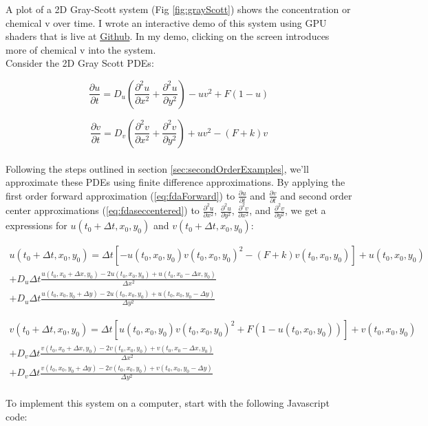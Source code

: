 {  A plot of a 2D Gray-Scott system (Fig \ref{fig:grayScott}) shows the concentration or chemical v over time.  I wrote an interactive demo of this system using GPU shaders that is live at  \href{http://git.amandaghassaei.com/ReactionDiffusionShader/}{Github}.  In my demo, clicking on the screen introduces more of chemical v into the system.\\
  
  Consider the 2D Gray Scott PDEs:
  
   \begin{equation}
  \frac{\partial u}{\partial t} = D_{u}\left(\frac{\partial^{2} u}{\partial x^{2}}+\frac{\partial^{2} u}{\partial y^{2}} \right) -uv^{2} + F(1-u)
  \end{equation}
  
   \begin{equation}
  \frac{\partial v}{\partial t} = D_{v}\left(\frac{\partial^{2} v}{\partial x^{2}}+\frac{\partial^{2} v}{\partial y^{2}} \right) +uv^{2} - (F+k)v
  \end{equation}
  \\
  Following the steps outlined in section \ref{sec:secondOrderExamples}, we'll approximate these PDEs using finite difference approximations.  By applying the first order forward approximation (\ref{eq:fdaForward}) to $\frac{\partial u}{\partial t}$ and $\frac{\partial v}{\partial t}$ and second order center approximations (\ref{eq:fdaseccentered}) to $\frac{\partial^{2} u}{\partial x^{2}}$, $\frac{\partial^{2} u}{\partial y^{2}}$, $\frac{\partial^{2} v}{\partial x^{2}}$, and $\frac{\partial^{2} v}{\partial y^{2}}$, we get a expressions for $u(t_{0} + \Delta  t, x_{0}, y_{0})$ and $v(t_{0} + \Delta  t, x_{0}, y_{0})$:
  
   \begin{multline}\label{eq:gsdifferentialu}
    u(t_{0} + \Delta  t, x_{0}, y_{0}) = \Delta  t[-u(t_{0}, x_{0}, y_{0})v(t_{0}, x_{0}, y_{0})^{2} - (F+k)v(t_{0}, x_{0}, y_{0})] + u(t_{0}, x_{0}, y_{0})\\
    + D_{u}\Delta  t\frac{u(t_{0},x_{0} + \Delta  x, y_{0})- 2u(t_{0},x_{0}, y_{0}) + u(t_{0},x_{0} -\Delta  x, y_{0})}{\Delta  x^{2}} \\
    + D_{u}\Delta  t\frac{u(t_{0},x_{0} , y_{0}+ \Delta  y)- 2u(t_{0},x_{0}, y_{0}) + u(t_{0},x_{0} , y_{0}-\Delta  y)}{\Delta  y^{2}}
  \end{multline}
  
    \begin{multline}\label{eq:gsdifferentialv}
    v(t_{0} + \Delta  t, x_{0}, y_{0}) = \Delta  t[u(t_{0}, x_{0}, y_{0})v(t_{0}, x_{0}, y_{0})^{2} + F(1-u(t_{0}, x_{0}, y_{0}))] + v(t_{0}, x_{0}, y_{0})\\
    + D_{v}\Delta  t\frac{v(t_{0},x_{0} + \Delta  x, y_{0})- 2v(t_{0},x_{0}, y_{0}) + v(t_{0},x_{0} -\Delta  x, y_{0})}{\Delta  x^{2}} \\
    + D_{v}\Delta  t\frac{v(t_{0},x_{0} , y_{0}+ \Delta  y)- 2v(t_{0},x_{0}, y_{0}) + v(t_{0},x_{0} , y_{0}-\Delta  y)}{\Delta  y^{2}}
  \end{multline}
  \\
  To implement this system on a computer, start with the following Javascript code:

}
